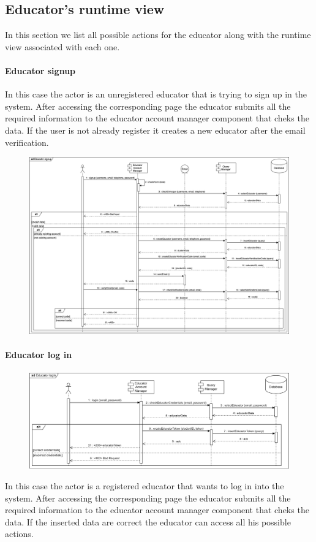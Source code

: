 \documentclass[12pt, a4paper]{report}
\begin{document}
    \subsection{Educator's runtime view}
    In this section we list all possible actions for the educator along with the runtime view associated with each one. 
    \paragraph*{Educator signup}
    In this case the actor is an unregistered educator that is trying to sign up in the system.
    After accessing the corresponding page the educator submits all the required information to the educator account manager component that cheks the data. 
    If the user is not already register it creates a new educator after the email verification. 
    \begin{figure}[H]
        \centering
        \includegraphics[width=1.0\linewidth]{images/esrv.png}
    \end{figure}

    \paragraph*{Educator log in}
    \begin{figure}[H]
        \centering
        \includegraphics[width=1.0\linewidth]{images/elirv.png}
    \end{figure}
    In this case the actor is a registered educator that wants to log in into the system. 
    After accessing the corresponding page the educator submits all the required information to the educator account manager component that cheks the data. 
    If the inserted data are correct the educator can access all his possible actions. 
\end{document}
